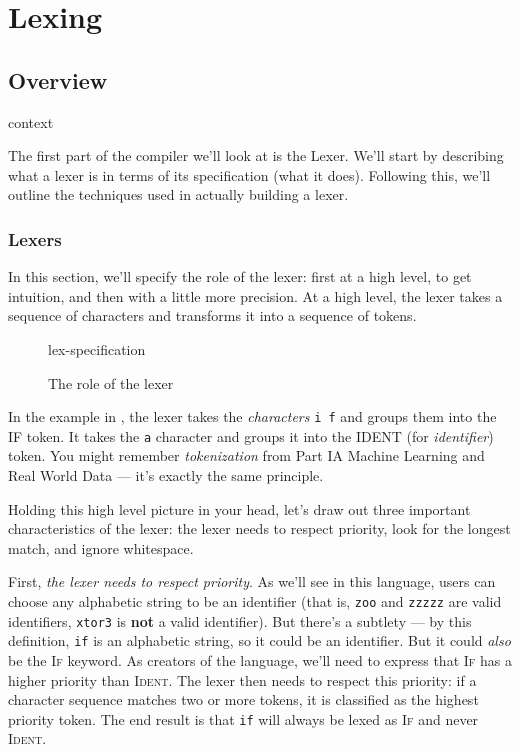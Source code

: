 \chapter{Lexing}

\section{Overview}
\begin{center}
{context}
\end{center}

The first part of the compiler we'll look at is the Lexer. We'll start by describing what a lexer is in terms of its specification (what it does). Following this, we'll outline the techniques used in actually building a lexer.


\subsection{Lexers}
In this section, we'll specify the role of the lexer: first at a high level, to get intuition, and then with a little more precision. At a high level, the lexer takes a sequence of characters and transforms it into a sequence of tokens.  

\begin{figure}[H]
\begin{center}
{lex-specification}
\end{center}
\label{fig:lex-specification}
\caption{The role of the lexer}
\end{figure}

In the example in , the lexer takes the \emph{characters} \texttt{i f} and groups them into the \textsc{IF} token. It takes the \texttt{a} character and groups it into the \textsc{IDENT} (for \emph{identifier}) token. You might remember \emph{tokenization} from {\sffamily Part IA Machine Learning and Real World Data} --- it's exactly the same principle. 

Holding this high level picture in your head, let's draw out three important characteristics of the lexer: the lexer needs to respect priority, look for the longest match, and ignore whitespace.

First, \emph{the lexer needs to respect priority}. As we'll see in this language, users can choose any alphabetic string to be an identifier (that is, \texttt{zoo} and \texttt{zzzzz} are valid identifiers, \texttt{xtor3} is \textbf{not} a valid identifier). But there's a subtlety --- by this definition, \texttt{if} is an alphabetic string, so it could be an identifier. But it could \emph{also} be the \textsc{If} keyword. As creators of the language, we'll need to express that \textsc{If} has a higher priority than \textsc{Ident}. The lexer then needs to respect this priority: if a character sequence matches two or more tokens, it is classified as the highest priority token. The end result is that \texttt{if} will always be lexed as \textsc{If} and never \textsc{Ident}. 

